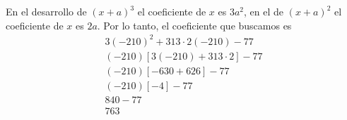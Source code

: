 \begin{section-problem}
\begin{solution}
        En el desarrollo de $(x + a)^3$ el coeficiente de $x$ es $3a^2$, en el de $(x + a)^2$ el coeficiente de $x$ es $2a$.
        Por lo tanto, el coeficiente que buscamos es
        \begin{gather*}
            3(-210)^2 + 313\cdot2(-210) - 77\\
            (-210)\left[3(-210) + 313\cdot2\right]  - 77 \\
            (-210)\left[-630 + 626\right]  - 77 \\
            (-210)\left[-4\right]  - 77 \\
            840 - 77\\
            \boxed{763}
        \end{gather*}
    \end{solution}
\end{section-problem}